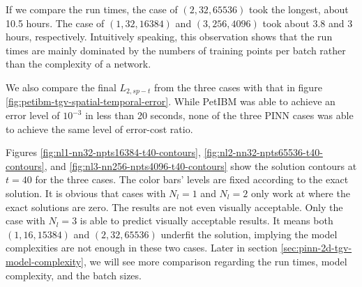If we compare the run times, the case of $(2, 32, 65536)$ took the longest, about 10.5 hours.
The case of $(1, 32, 16384)$ and $(3, 256, 4096)$ took about 3.8 and 3 hours, respectively.
Intuitively speaking, this observation shows that the run times are mainly dominated by the numbers of training points per batch rather than the complexity of a network.

We also compare the final $L_{2,sp-t}$ from the three cases with that in figure \ref{fig:petibm-tgv-spatial-temporal-error}.
While PetIBM was able to achieve an error level of $10^{-3}$ in less than 20 seconds, none of the three PINN cases was able to achieve the same level of error-cost ratio.

Figures \ref{fig:nl1-nn32-npts16384-t40-contours}, \ref{fig:nl2-nn32-npts65536-t40-contours}, and \ref{fig:nl3-nn256-npts4096-t40-contours} show the solution contours at $t=40$ for the three cases.
The color bars' levels are fixed according to the exact solution.
It is obvious that cases with $N_l=1$ and $N_l=2$ only work at where the exact solutions are zero.
The results are not even visually acceptable.
Only the case with $N_l=3$ is able to predict visually acceptable results.
It means both $(1, 16, 15384)$ and $(2, 32, 65536)$ underfit the solution, implying the model complexities are not enough in these two cases.
Later in section \ref{sec:pinn-2d-tgv-model-complexity}, we will see more comparison regarding the run times, model complexity, and the batch sizes.
